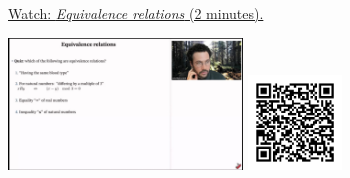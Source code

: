 
\begin{minipage}{10cm}
    \href{https://act4e-spring21.netlify.app/videos/spring2021-relations:relations:equivalence-rel.html}{Watch: \emph{Equivalence relations} (2 minutes).}
        
    \href{https://act4e-spring21.netlify.app/videos/spring2021-relations:relations:equivalence-rel.html}{\includegraphics[height=3.5cm]{spring2021-relations:relations:equivalence-rel/thumbnails.jpg}}
    \href{https://act4e-spring21.netlify.app/videos/spring2021-relations:relations:equivalence-rel.html}{\includegraphics[height=2.5cm]{spring2021-relations:relations:equivalence-rel/qrcode.png}}
\end{minipage}
